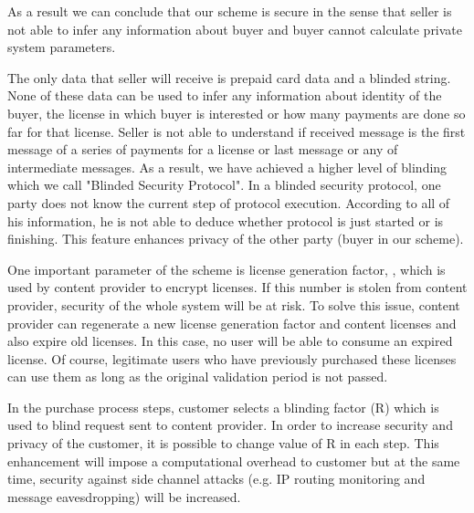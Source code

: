 \documentclass[times]{secauth}
\begin{document}
As a result we can conclude that our scheme is secure in the sense that seller is not able to infer any information about buyer and buyer cannot calculate private system parameters.

The only data that seller will receive is prepaid card data and a blinded string. None of these data can be used to infer any information about identity of the buyer, the license in which buyer is interested or how many payments are done so far for that license. Seller is not able to understand if received message is the first message of a series of payments for a license or last message or any of intermediate messages. As a result, we have achieved a higher level of blinding which we call "Blinded Security Protocol". In a blinded security protocol, one party does not know the current step of protocol execution. According to all of his information, he is not able to deduce whether protocol is just started or is finishing. This feature enhances privacy of the other party (buyer in our scheme).

One important parameter of the scheme is license generation factor, , which is used by content provider to encrypt licenses. If this number is stolen from content provider, security of the whole system will be at risk. To solve this issue, content provider can regenerate a new license generation factor and content licenses and also expire old licenses. In this case, no user will be able to consume an expired license. Of course, legitimate users who have previously purchased these licenses can use them as long as the original validation period is not passed.

In the purchase process steps, customer selects a blinding factor (R) which is used to blind request sent to content provider. In order to increase security and privacy of the customer, it is possible to change value of R in each step. This enhancement will impose a computational overhead to customer but at the same time, security against side channel attacks (e.g. IP routing monitoring and message eavesdropping) will be increased.
\end{document}
